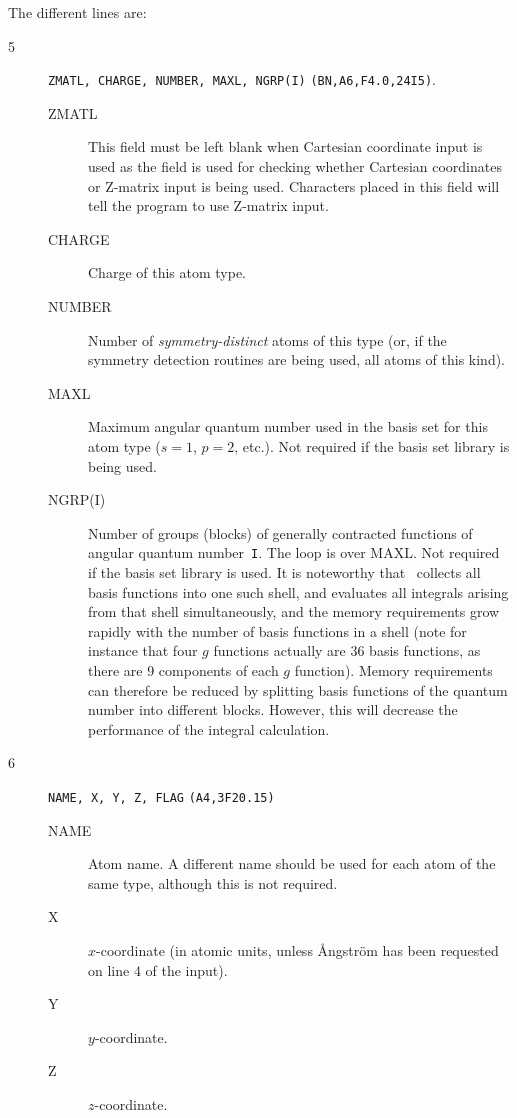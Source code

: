 The different lines are:
\begin{description}
\item[5] \verb|ZMATL, CHARGE, NUMBER, MAXL, NGRP(I)|
{\tt (BN,A6,F4.0,24I5)}.
\begin{description}
\item[ZMATL] This field must be left blank when Cartesian
coordinate input is used as the field
is used for checking whether 
Cartesian coordinates or Z-matrix input is being
used. Characters 
placed in this field will tell the program to use Z-matrix input.
\item[CHARGE] Charge of this atom type.
\item[NUMBER] Number of {\em symmetry-distinct} atoms of
this type (or, if the symmetry detection routines are being used, all
atoms of this kind).
\item[MAXL] Maximum angular quantum number used in the
basis set for this atom type ($s=1$, $p=2$, etc.). Not required if the
basis set library is being used. 
\item[NGRP(I)] Number of groups (blocks) of generally contracted
functions of angular quantum number~{\tt I}. The loop is over MAXL. Not
required if the basis set library is used. It is noteworthy that
\siraba\ collects all basis functions into one such shell, and
evaluates all integrals arising from that shell simultaneously, and 
the memory requirements grow rapidly with the number of basis
functions in a shell (note for instance that four $g$ functions
actually are 36
basis functions, as there are 9 components of each $g$
function). Memory requirements can therefore be reduced
by splitting 
basis functions of the quantum number into different blocks. However,
this will decrease the performance of the integral calculation. 
\end{description}
\item[6] \verb|NAME, X, Y, Z, FLAG| {\tt (A4,3F20.15)}
\begin{description}
\item[NAME] Atom name.  A different name should be used for
each atom of the same type, although this is not required.
\item[X] $x$-coordinate (in atomic units, unless \AA ngstr\"{o}m
has been requested on line $4$ of the input).
\item[Y] $y$-coordinate.
\item[Z] $z$-coordinate.

\end{description}
\end{description}
